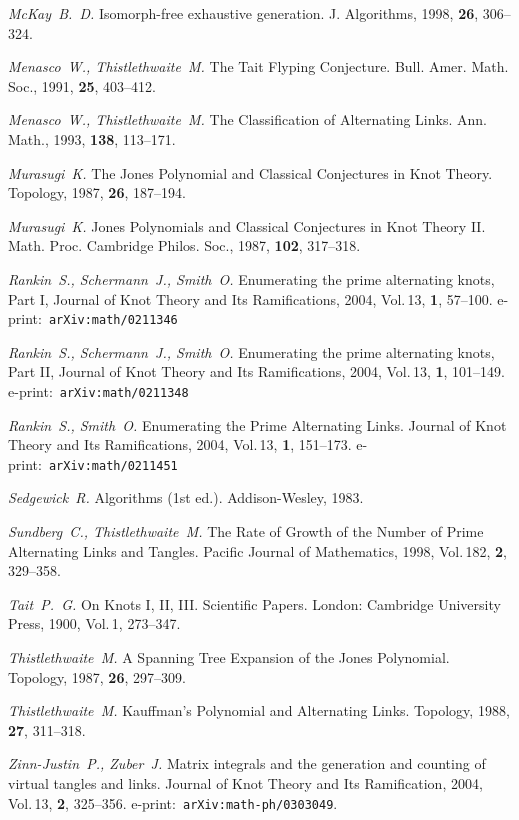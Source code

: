 \documentclass[12pt]{article}
\theoremstyle{plain}
\theoremstyle{definition}
\begin{document}
\begin{thebibliography}{88}
		{\em McKay~B.~D.}
		Isomorph-free exhaustive generation.
		J. Algorithms, 1998, {\bf 26}, 306--324.

		{\em Menasco~W., Thistlethwaite~M.}
		The Tait Flyping Conjecture.
		Bull. Amer. Math. Soc., 1991, {\bf 25}, 403--412.

		{\em Menasco~W., Thistlethwaite~M.}
		The Classification of Alternating Links.
		Ann. Math., 1993, {\bf 138}, 113--171.

		{\em Murasugi~K.}
		The Jones Polynomial and Classical Conjectures in Knot Theory.
		Topology, 1987, {\bf 26}, 187--194.

		{\em Murasugi~K.}
		Jones Polynomials and Classical Conjectures in Knot Theory II.
		Math. Proc. Cambridge Philos. Soc., 1987, {\bf 102}, 317--318.

		{\em Rankin~S., Schermann~J., Smith~O.}
		Enumerating the prime alternating knots, Part I,
		Journal of Knot Theory and Its Ramifications, 2004, Vol.\,13, {\bf 1}, 57--100.
		e-print:~\texttt{arXiv:math/0211346}

		{\em Rankin~S., Schermann~J., Smith~O.}
		Enumerating the prime alternating knots, Part II,
		Journal of Knot Theory and Its Ramifications, 2004, Vol.\,13, {\bf 1}, 101--149.
		e-print:~\texttt{arXiv:math/0211348}

		{\em Rankin~S., Smith~O.}
		Enumerating the Prime Alternating Links.
		Journal of Knot Theory and Its Ramifications, 2004, Vol.\,13, {\bf 1}, 151--173.
		e-print:~\texttt{arXiv:math/0211451}

		{\em Sedgewick~R.}
		Algorithms (1st ed.).
		Addison-Wesley, 1983.

		{\em Sundberg~C., Thistlethwaite~M.}
		The Rate of Growth of the Number of Prime Alternating Links and Tangles.
		Pacific Journal of Mathematics, 1998, Vol.\,182, {\bf 2}, 329--358.

		{\em Tait~P.~G.}
		On Knots I, II, III.
		Scientific Papers.
		London: Cambridge University Press, 1900, Vol.\,1, 273--347.

		{\em Thistlethwaite~M.}
		A Spanning Tree Expansion of the Jones Polynomial.
		Topology, 1987, {\bf 26}, 297--309. 

		{\em Thistlethwaite~M.}
		Kauffman's Polynomial and Alternating Links.
		Topology, 1988, {\bf 27}, 311--318.

		{\em Zinn-Justin~P., Zuber~J.}
		Matrix integrals and the generation and counting of virtual tangles and links.
		Journal of Knot Theory and Its Ramification, 2004, Vol.\,13, {\bf 2}, 325--356.
		e-print:~\texttt{arXiv:math-ph/0303049}.

	\end{thebibliography}
\end{document}
